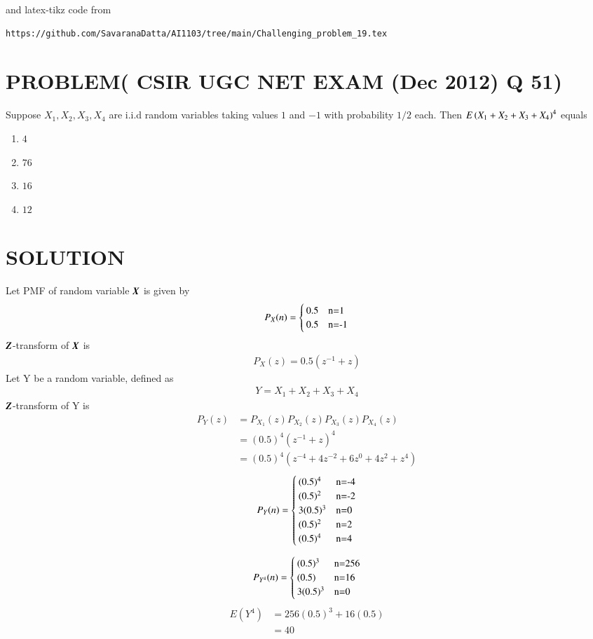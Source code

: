 \documentclass[journal,12pt,twocolumn]{IEEEtran}
\begin{document}
%
and latex-tikz code from 
%
\begin{lstlisting}
https://github.com/SavaranaDatta/AI1103/tree/main/Challenging_problem_19.tex
\end{lstlisting}
\section{PROBLEM( CSIR UGC NET EXAM (Dec 2012) Q 51)}

Suppose $X_1,X_2,X_3,X_4$ are i.i.d random variables taking values $1$ and $-1$ with probability $1/2$ each. Then $E\left(X_1+X_2 +X_3 +X_4\right)^4$ equals
\begin{multicols}{4}
\begin{enumerate}
    \item $4$
    \item $76$
    \item $16$
    \item $12$
\end{enumerate}
\end{multicols}
\section{SOLUTION}
Let PMF of random variable $\textbf{\emph{X}}$ is given by
\begin{align}
P_{X}(n)=
\begin{cases}
0.5 & $n=1$\\
0.5 & $n=-1$
\end{cases}
\end{align}
$\textbf{\emph{Z}}$-transform of $\textbf{\emph{X}}$ is
\begin{align}
P_{X}(z)= 0.5(z^{-1}+z)
\end{align}
Let Y be a random variable, defined as
\begin{align}
    Y=X_{1}+X_{2}+X_{3}+X_{4}
\end{align}
$\textbf{\emph{Z}}$-transform of Y is 
\begin{align}
P_{Y}(z)  &= P_{X_{1}}(z)P_{X_{2}}(z)P_{X_{3}}(z)P_{X_{4}}(z)\\
          &= (0.5)^{4}(z^{-1}+z)^{4}\\
          &= (0.5)^{4}(z^{-4}+4z^{-2}+6z^{0}+4z^{2}+z^{4})
\end{align}
\begin{align}
    P_{Y}(n)=
    \begin{cases}
    (0.5)^{4} & $n=-4$\\
    (0.5)^{2} & $n=-2$\\
    3(0.5)^{3} & $n=0$\\
    (0.5)^{2} & $n=2$\\
    (0.5)^{4} & $n=4$
    \end{cases}
\end{align}

\begin{align}
    P_{Y^{4}}(n)=
    \begin{cases}
    (0.5)^{3} & $n=256$\\
    (0.5) & $n=16$\\
    3(0.5)^{3} & $n=0$\\
    \end{cases}
\end{align}
\begin{align}
    E(Y^{4}) & = 256(0.5)^{3}+16(0.5)\\
             & = 40  
\end{align}
\end{document}
